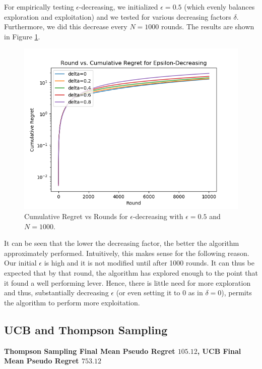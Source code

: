 \documentclass[12pt]{article}
\begin{document}
For empirically testing $\epsilon$-decreasing, we initialized $\epsilon=0.5$ (which evenly balances exploration and exploitation) and we tested for various decreasing factors $\delta$. Furthermore, we did this decrease every $N=1000$ rounds. The results are shown in Figure \ref{fig:epsilon-decreasing}.
\begin{figure}
\begin{center}
\includegraphics[scale=0.75]{epsilon-decreasing.png}
  \captionsetup{justification=centering}
  \caption{Cumulative Regret vs Rounds for $\epsilon$-decreasing with $\epsilon=0.5$ and $N=1000$.}
  \label{fig:epsilon-decreasing}
 \end{center}
\end{figure}
It can be seen that the lower the decreasing factor, the better the algorithm approximately performed. Intuitively, this makes sense for the following reason. Our initial $\epsilon$ is high and it is not modified until after 1000 rounds. It can thus be expected that by that round, the algorithm has explored enough to the point that it found a well performing lever. Hence, there is little need for more exploration and thus, substantially decreasing $\epsilon$ (or even setting it to 0 as in $\delta=0$), permits the algorithm to perform more exploitation.

\subsection{UCB and Thompson Sampling}

\textbf{Thompson Sampling Final Mean Pseudo Regret $105.12$, UCB Final Mean Pseudo Regret $753.12$}
\end{document}
